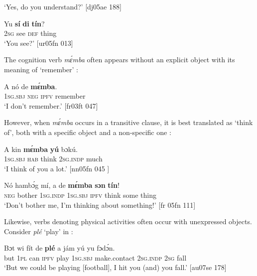 \glt ‘Yes, do you understand?’ [dj05ae 188]
\z


\ea%
    \label{ex:key:1291}
    \gll Yu  \textbf{sí}  \textbf{di}  \textbf{tín}?\\
\textsc{2sg}  see  \textsc{def}  thing\\

\glt ‘You see?’ [ur05fn 013]
\z

The cognition verb \textit{mɛ́mba} often appears without an explicit object with its meaning of ‘remember’ :


\ea%
    \label{ex:key:1292}
    \gll A    nó  de  \textbf{mɛ́mba}.\\
\textsc{1sg.sbj}  \textsc{neg}  \textsc{ipfv}  remember\\

\glt ‘I don’t remember.’ [fr03ft 047]
\z

However, when \textit{mɛ́mba} occurs in a transitive clause, it is best translated as ‘think of’, both with a specific object  and a non-specific one : 


\ea%
    \label{ex:key:1293}
    \gll A    kin  \textbf{mɛ́mba}  \textbf{yú}    bɔkú.\\
\textsc{1sg.sbj}  \textsc{hab}  think  \textsc{2sg.indp}  much\\

\glt ‘I think of you a lot.’ [nn05fn 045 ]
\z


\ea%
    \label{ex:key:1294}
    \gll Nó  hambɔ́g  mí,    a    de  \textbf{mɛ́mba}  \textbf{sɔn}    \textbf{tín}!\\
\textsc{neg}  bother  \textsc{1sg.indp}  \textsc{1sg.sbj}  \textsc{ipfv}  think  some  thing\\

\glt ‘Don’t bother me, I’m thinking about something!’ [fr 05fn 111]
\z

Likewise, verbs denoting physical activities often occur with unexpressed objects. Consider \textit{plé} ‘play’ in : 


\ea%
    \label{ex:key:1295}
    \gll Bɔt  wi  fít  de  \textbf{plé}  a    jám        yú     yu  fɔdɔ́n.\\
but  \textsc{1pl}  can  \textsc{ipfv}  play  \textsc{1sg.sbj}  make.contact    \textsc{2sg.indp}  \textsc{2sg}  fall\\

\glt ‘But we could be playing [football], I hit you (and) you fall.’ [au07se 178]
\z

